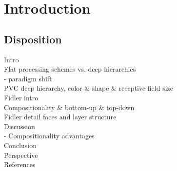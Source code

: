 \section{Introduction}
\label{sec:introduction}


\subsection{Disposition}
Intro \\
Flat processing schemes vs. deep hierarchies\\
-     paradigm shift \\
PVC deep hierarchy, color \& shape \& receptive field size\\
Fidler intro\\
Compositionality \& bottom-up \& top-down\\
Fidler detail faces and layer structure \\
Discussion \\
-    Compositionality advantages \\
Conclusion \\
Perspective \\
References \\